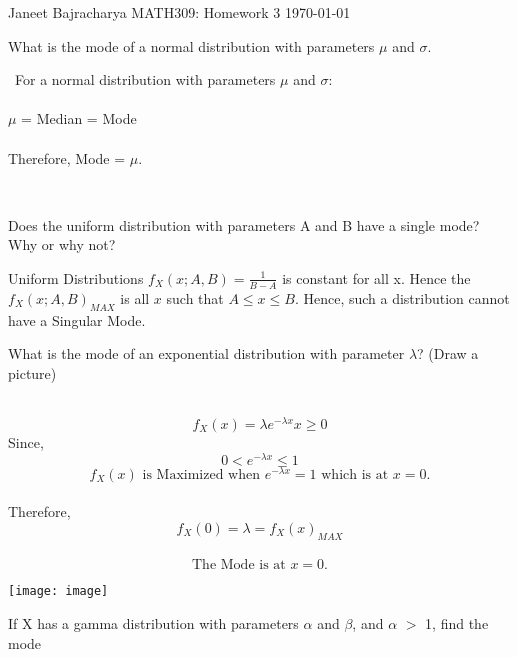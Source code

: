 \documentclass[12pt]{article}
\newenvironment{ex}[2][Exercise]{\begin{trivlist}
\item[\hskip \labelsep {\bfseries #1}\hskip \labelsep {\bfseries #2.}]}{\end{trivlist}}
\newenvironment{sol}[1][Solution]{\begin{trivlist}
\item[\hskip \labelsep {\bfseries #1:}]}{\end{trivlist}}
\begin{document}

\noindent Janeet Bajracharya \hfill {\Large MATH309: Homework 3} \hfill \today

\begin{ex}{4.a} 
What is the mode of a normal distribution with parameters $\mu$ and $\sigma$.
\end{ex}

\begin{sol}\
For a normal distribution with parameters $\mu$ and $\sigma$:\\\\
$\mu$ = Median = Mode
\\\\
Therefore, Mode = $\mu$.
\end{sol}\
\newpage
\begin{ex}{4.b}
Does the uniform distribution with parameters A and B have a single mode? Why or why not?
\end{ex}
\begin{sol}
Uniform Distributions $f_X(x;A,B) = \frac{1}{B-A}$ is constant for all x. Hence the $f_X(x;A,B)_{MAX}$ is all $x$ such that $A\leq x \leq B$. Hence, such a distribution cannot have a Singular Mode.
\end{sol}
\newpage
\begin{ex}{4.c}
What is the mode of an exponential distribution with parameter $\lambda$? (Draw
a picture)
\end{ex}
\begin{sol}\
\[
f_X(x) = \lambda e^{-\lambda x}  {x\geq0}
\]
Since,
\[
0 < e^{-\lambda x} \leq 1
\]
\[
\text{$f_X(x)$ is Maximized when $e^{-\lambda x} = 1$ which is at $x=0$.}
\]\\
Therefore,
\[
f_X(0) = \lambda = f_X(x)_{MAX}
\]
\\
\[
\text{The Mode is at $x = 0$.}
\]

\texttt{[image: image]}

\end{sol}
\newpage
\begin{ex}{4.d} 
If X has a gamma distribution with parameters $\alpha$ and $\beta$, and $\alpha$ $>$ 1, find
the mode
\end{ex}
\end{document}
